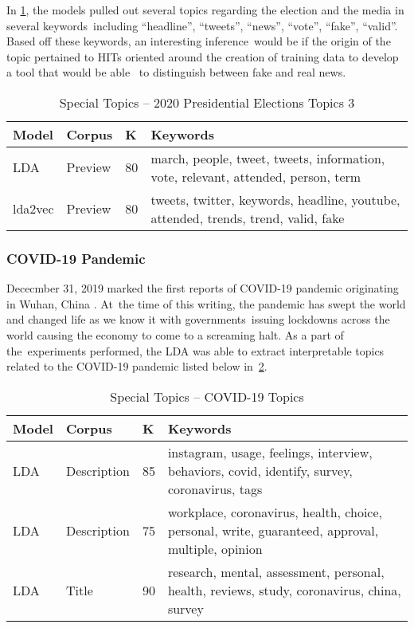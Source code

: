 \documentclass[letterpaper,12pt]{article}
\begin{document}
In \ref{tab:fake_news}, the models pulled out several topics regarding the election and the media in several keywords\
including ``headline'', ``tweets'', ``news'', ``vote'', ``fake'', ``valid''. Based off these keywords, an interesting inference\
would be if the origin of the topic pertained to HITs oriented around the creation of training data to develop a tool that would be able \
to distinguish between fake and  real news.
\begin{table}
	\caption{\label{tab:fake_news} Special Topics -- 2020 Presidential Elections Topics 3}
	\begin{center}
	\begin{tabular}{|l|l|l|p{10cm}|}
		\hline
		\textbf{Model} &   \textbf{Corpus} &   \textbf{K} &                                                                            \textbf{Keywords} \\
 \hline
			LDA &  Preview &  80 &   march, people, tweet, tweets, information, vote, relevant, attended, person, term \\
	\hline
			lda2vec &  Preview &  80 &  tweets, twitter, keywords, headline, youtube, attended, trends, trend, valid, fake \\
 \hline
	\end{tabular}
\end{center}
\end{table}

\subsubsection{COVID-19 Pandemic}
Dececmber 31, 2019 marked the first reports of COVID-19 pandemic originating in Wuhan, China \cite{taylor_2020}. At\
the time of this writing, the pandemic has swept the world and changed life as we know it with governments\
issuing lockdowns across the world causing the economy to come to a screaming halt. As a part of the\
experiments performed, the LDA was able to extract interpretable topics related to the COVID-19 pandemic listed below in\
\ref{tab:corona}.

\begin{table}
	\caption{\label{tab:corona} Special Topics -- COVID-19 Topics}
	\begin{center}
	\begin{tabular}{|l|l|l|p{10cm}|}
		\hline
		\textbf{Model} &       \textbf{Corpus} &   \textbf{K} &                                                                                          \textbf{Keywords} \\
		\hline
			LDA &  Description &  85 &      instagram, usage, feelings, interview, behaviors, covid, identify, survey, coronavirus, tags \\
		\hline
			LDA &  Description &  75 &  workplace, coronavirus, health, choice, personal, write, guaranteed, approval, multiple, opinion \\
		\hline
			LDA &        Title &  90 &        research, mental, assessment, personal, health, reviews, study, coronavirus, china, survey \\
		\hline
	\end{tabular}
\end{center}
\end{table}
\end{document}
